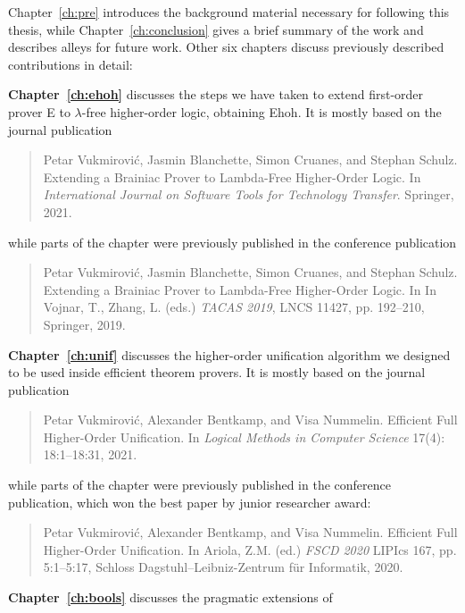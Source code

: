 Chapter~\ref{ch:pre} introduces the background material necessary for following this thesis,
while Chapter~\ref{ch:conclusion} gives a brief summary of the work and describes alleys for future work.
Other six chapters discuss previously described contributions in detail:

\vspace{0.5em}
\noindent\textbf{Chapter~\ref{ch:ehoh}} discusses the steps we have taken to extend first-order
  prover E to $\lambda$-free higher-order logic, obtaining Ehoh. It is mostly based on the journal publication
  \begin{quote}
    Petar Vukmirović, Jasmin Blanchette, Simon Cruanes, and Stephan Schulz.
    Extending a Brainiac Prover to Lambda-Free Higher-Order Logic.
    In \emph{International Journal on Software Tools for Technology Transfer}. Springer, 2021.  
  \end{quote}
\vspace{-0.3em}
while parts of the chapter were previously published in the conference publication
\vspace{-0.3em}
  \begin{quote}
    Petar Vukmirović, Jasmin Blanchette, Simon Cruanes, and Stephan Schulz.
    Extending a Brainiac Prover to Lambda-Free Higher-Order Logic.
    In  In Vojnar, T., Zhang, L. (eds.) \emph{TACAS 2019}, LNCS 11427, pp. 192--210, Springer, 2019.
  \end{quote}
\noindent\textbf{Chapter~\ref{ch:unif}} discusses the higher-order unification algorithm we designed to be used
inside efficient theorem provers. It is mostly based on the journal publication
  \begin{quote}
    Petar Vukmirović, Alexander Bentkamp, and Visa Nummelin. Efficient Full Hi\-gher-Order Unification. 
    In \emph{Logical Methods in Computer Science} 17(4): 18:1--18:31, 2021.
  \end{quote}
\vspace{-0.3em}
while parts of the chapter were previously published in the conference
publication, which won the best paper by junior researcher award:
\vspace{-0.3em}
\begin{quote}
  Petar Vukmirović, Alexander Bentkamp, and Visa Nummelin. Efficient Full Hi\-gher-Order Unification. 
  In Ariola, Z.M. (ed.) \emph{FSCD 2020} LIPIcs 167, pp. 5:1--5:17, Schloss Dagstuhl--Leibniz-Zentrum für Informatik, 2020. 
\end{quote}
\noindent\textbf{Chapter~\ref{ch:bools}} discusses the pragmatic extensions of

